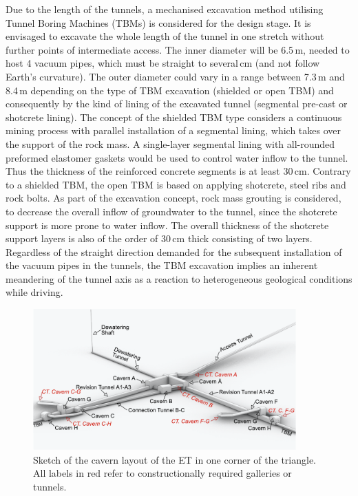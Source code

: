 Due to the length of the tunnels, a mechanised excavation method utilising Tunnel Boring Machines (TBMs) is considered for the design stage. It is envisaged to excavate the whole length of the tunnel in one stretch without further points of intermediate access.
The inner diameter will be 6.5\,m, needed to host 4 vacuum pipes, which must be straight to several\,cm (and not follow Earth's curvature). The outer diameter could vary in a range between 7.3\,m and 8.4\,m depending on the type of TBM excavation (shielded or open TBM) and consequently by the kind of lining of the excavated tunnel (segmental pre-cast or shotcrete lining). 
The concept of the shielded TBM type considers a continuous mining process with parallel installation of a segmental lining, which takes over the support of the rock mass. A single-layer segmental lining with all-rounded preformed elastomer gaskets would be used to control water inflow to the tunnel. Thus the thickness of the reinforced concrete segments is at least 30\,cm.
Contrary to a shielded TBM, the open TBM is based on applying shotcrete, steel ribs and rock bolts. As part of the excavation concept, rock mass grouting is considered, to decrease the overall inflow of groundwater to the tunnel, since the shotcrete support is more prone to water inflow.
The overall thickness of the shotcrete support layers is also of the order of 30\,cm thick consisting of two layers. Regardless of the straight direction demanded for the subsequent installation of the vacuum pipes in the tunnels, the TBM excavation implies an inherent meandering of the tunnel axis as a reaction to heterogeneous geological conditions while driving. 
 \begin{figure}[tbh]
	\centering
		\includegraphics[width=0.9\textwidth]{Figures/ET_caverns.png}
	\caption{Sketch of the cavern layout of the ET in one corner of the
	triangle. 
	All labels in red refer to constructionally required galleries or tunnels.
	\label{fig:ET_caverns}}
\end{figure}

